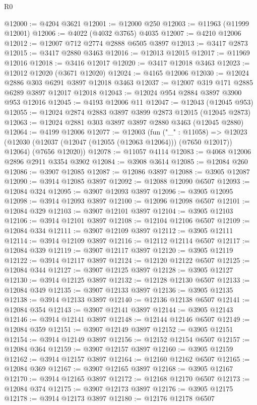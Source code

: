 \begin{lexlean}{R0}
\begin{coremodule}
@12000 := @4204 @3621
@12001 := @12000 @250
@12003 := @11963 (@11999 @12001)
@12006 := @4022 (@4032 @3765) @4035
@12007 := @4210 @12006
@12012 := @12007 @712 @2774 @2888 @6505 @3897
@12013 := @3417 @2873
@12015 := @3417 @2880 @3463
@12016 := @12013 @12015
@12017 := @11969 @12016
@12018 := @3416 @12017
@12020 := @3417 @12018 @3463
@12023 := @12012 @12020 (@3671 @12020)
@12024 := @4165 @12006
@12030 := @12024 @2886 @303 @6291 @3897 @12018 @3463
@12037 := @12007 @319 @171 @2885 @6289 @3897 @12017 @12018
@12043 := @12024 @954 @2884 @3897 @3900 @953 @12016
@12045 := @4193 @12006 @11
@12047 := @12043 (@12045 @953)
@12055 := @12024 @2874 @2883 @3897 @3899 @2873 @12015 (@12045 @2873)
@12063 := @12024 @2881 @303 @3897 @3897 @2880 @3463 (@12045 @2880)
@12064 := @4199 @12006
@12077 := @12003
    (fun ("_" : @11058) =>
    @12023 (@12030 (@12037 (@12047 (@12055 (@12063 @12064))) (@7650 @12017)) @12064) (@7656 @12020))
@12078 := @11057 @4114
@12083 := @4068 @12006 @2896 @2911 @3354 @3902
@12084 := @3908 @3614
@12085 := @12084 @260
@12086 := @3907 @12085
@12087 := @12086 @3897
@12088 := @3905 @12087
@12090 := @3914 @12085 @3897
@12092 := @12088 @12090 @6507
@12093 := @12084 @324
@12095 := @3907 @12093 @3897
@12096 := @3905 @12095
@12098 := @3914 @12093 @3897
@12100 := @12096 @12098 @6507
@12101 := @12084 @329
@12103 := @3907 @12101 @3897
@12104 := @3905 @12103
@12106 := @3914 @12101 @3897
@12108 := @12104 @12106 @6507
@12109 := @12084 @334
@12111 := @3907 @12109 @3897
@12112 := @3905 @12111
@12114 := @3914 @12109 @3897
@12116 := @12112 @12114 @6507
@12117 := @12084 @339
@12119 := @3907 @12117 @3897
@12120 := @3905 @12119
@12122 := @3914 @12117 @3897
@12124 := @12120 @12122 @6507
@12125 := @12084 @344
@12127 := @3907 @12125 @3897
@12128 := @3905 @12127
@12130 := @3914 @12125 @3897
@12132 := @12128 @12130 @6507
@12133 := @12084 @349
@12135 := @3907 @12133 @3897
@12136 := @3905 @12135
@12138 := @3914 @12133 @3897
@12140 := @12136 @12138 @6507
@12141 := @12084 @354
@12143 := @3907 @12141 @3897
@12144 := @3905 @12143
@12146 := @3914 @12141 @3897
@12148 := @12144 @12146 @6507
@12149 := @12084 @359
@12151 := @3907 @12149 @3897
@12152 := @3905 @12151
@12154 := @3914 @12149 @3897
@12156 := @12152 @12154 @6507
@12157 := @12084 @364
@12159 := @3907 @12157 @3897
@12160 := @3905 @12159
@12162 := @3914 @12157 @3897
@12164 := @12160 @12162 @6507
@12165 := @12084 @369
@12167 := @3907 @12165 @3897
@12168 := @3905 @12167
@12170 := @3914 @12165 @3897
@12172 := @12168 @12170 @6507
@12173 := @12084 @374
@12175 := @3907 @12173 @3897
@12176 := @3905 @12175
@12178 := @3914 @12173 @3897
@12180 := @12176 @12178 @6507

\end{coremodule}
\end{lexlean}
